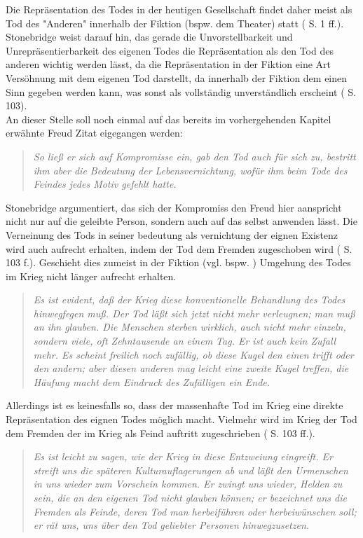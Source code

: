 \documentclass[11pt,a4paper,oneside,numbers=noenddot,bibliography=totocnumbered,DIV=13]{scrartcl}
\begin{document}
{ Die Repräsentation des Todes in der heutigen Gesellschaft findet daher meist als Tod des "Anderen" innerhalb der Fiktion (bspw. dem Theater) statt (\cite{liran_razinsky_how_2009} S. 1 ff.). Stonebridge weist darauf hin, das gerade die Unvorstellbarkeit und Unrepräsentierbarkeit des eigenen Todes die Repräsentation als den Tod des anderen wichtig werden lässt, da die Repräsentation in der Fiktion eine Art Versöhnung mit dem eigenen Tod darstellt, da innerhalb der Fiktion dem einen Sinn gegeben werden kann, was sonst als vollständig unverständlich erscheint (\cite{stonebridge_what_2009} S. 103). \\
An dieser Stelle soll noch einmal auf das bereits im vorhergehenden Kapitel erwähnte Freud Zitat eigegangen werden:
\begin{quote}
\textit{So ließ er sich auf Kompromisse ein, gab den Tod auch für sich zu, bestritt ihm aber die Bedeutung der Lebensvernichtung, wofür ihm beim Tode des Feindes jedes Motiv gefehlt hatte. }
\end{quote}
Stonebridge argumentiert, das sich der Kompromiss den Freud hier aanspricht nicht nur auf die geleibte Person, sondern auch auf das selbst anwenden lässt. Die Verneinung des Tods in seiner bedeutung als vernichtung der eignen Existenz wird auch aufrecht erhalten, indem der Tod dem Fremden zugeschoben wird (\cite{stonebridge_what_2009} S. 103 f.). Geschieht dies zumeist in der Fiktion (vgl. bspw. \cite{liran_razinsky_how_2009}) Umgehung des Todes im Krieg nicht länger aufrecht erhalten. 
\begin{quote}
\textit{Es ist evident, daß der Krieg diese konventionelle Behandlung des Todes hinwegfegen muß. Der Tod läßt sich jetzt nicht mehr verleugnen; man muß an ihn glauben. Die Menschen sterben wirklich, auch nicht mehr einzeln, sondern viele, oft Zehntausende an einem Tag. Er ist auch kein Zufall mehr. Es scheint freilich noch zufällig, ob diese Kugel den einen trifft oder den andern; aber diesen anderen mag leicht eine zweite Kugel treffen, die Häufung macht dem Eindruck des Zufälligen ein Ende.}
\end{quote}
Allerdings ist es keinesfalls so, dass der massenhafte Tod im Krieg eine direkte Repräsentation des eignen Todes möglich macht. Vielmehr wird im Krieg der Tod dem Fremden der im Krieg als Feind auftritt zugeschrieben (\cite{stonebridge_what_2009} S. 103 ff.). 
\begin{quote}
\textit{Es ist leicht zu sagen, wie der Krieg in diese Entzweiung eingreift. Er streift uns die späteren Kulturauflagerungen ab und läßt den Urmenschen in uns wieder zum Vorschein kommen. Er zwingt uns wieder, Helden zu sein, die an den eigenen Tod nicht glauben können; er bezeichnet uns die Fremden als Feinde, deren Tod man herbeiführen oder herbeiwünschen soll; er rät uns, uns über den Tod geliebter Personen hinwegzusetzen.}

\end{quote}}
\end{document}
